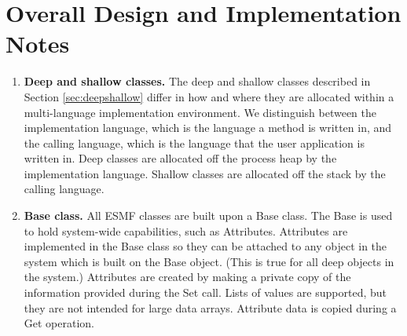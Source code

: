 
\section{Overall Design and Implementation Notes}
\label{sec:overallimpl}

\begin{enumerate}

\item {\bf Deep and shallow classes.}  The deep and shallow classes 
described in Section \ref{sec:deepshallow} differ in how and where they
are allocated within a multi-language implementation environment.  We
distinguish between the implementation language, which is the language
a method is written in, and the calling language, which is the language
that the user application is written in.  Deep classes are allocated 
off the process heap by the implementation language.  Shallow classes
are allocated off the stack by the calling language.  

\item {\bf Base class.} All ESMF classes are built upon a Base class.  The Base 
is used to hold system-wide capabilities, such as Attributes.  Attributes 
are implemented in the Base class so they can be attached to
any object in the system which is built on the Base object.  (This is true
for all deep objects in the system.)  Attributes are created by making a
private copy of the information provided during the Set call.  Lists of
values are supported, but they are not intended for large
data arrays.   Attribute data is copied during a Get operation.

\end{enumerate}
